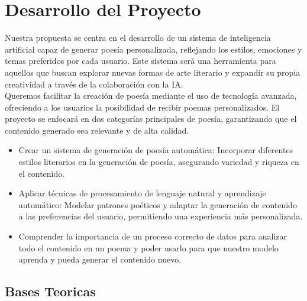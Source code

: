 \section{Desarrollo del Proyecto}

Nuestra propuesta se centra en el desarrollo de un sistema de inteligencia artificial capaz 
de generar poesía personalizada, reflejando los estilos, emociones y temas preferidos por 
cada usuario. Este sistema será una herramienta para aquellos que buscan explorar nuevas 
formas de arte literario y expandir su propia creatividad a través de la colaboración con la IA.\\

Queremos facilitar la creación de poesía mediante el uso de tecnología avanzada, ofreciendo a 
los usuarios la posibilidad de recibir poemas personalizados. El proyecto se enfocará en dos 
categorías principales de poesía, garantizando que el contenido generado sea relevante y de 
alta calidad.

\begin{itemize}
    \item Crear un sistema de generación de poesía automática: Incorporar diferentes estilos 
    literarios en la generación de poesía, asegurando variedad y riqueza en el contenido.

    \item Aplicar técnicas de procesamiento de lenguaje natural y aprendizaje automático: 
    Modelar patrones poéticos y adaptar la generación de contenido a las preferencias del 
    usuario, permitiendo una experiencia más personalizada.

    \item Comprender la importancia de un proceso correcto de datos para analizar todo el contenido
    en un poema y poder usarlo para que nuestro modelo aprenda y pueda generar el contenido nuevo. 
\end{itemize}

\subsection{Bases Teoricas}


